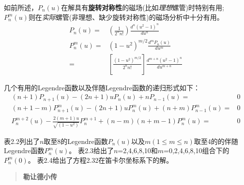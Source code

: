 如前所述，$P_n(u)$在解具有\textbf{旋转对称性}的磁场(比如\textit{理想}螺管)时特别有用;
$P_n^m(u)$则在\textit{实际}螺管(非理想、缺少旋转对称性)的磁场分析中十分有用。
\begin{subequations}\label{eqn:legendre function1}
	\begin{align}
P_n(u)=&\left(\frac{1}{2^n n!}\right)\frac{d^n(u^2-1)^n}{du^n} \\
P_n^m(u)=&(1-u^2)^{m/2}\frac{d^mP_n(u)}{du^m}\\
=&\left[\frac{(1-u^2)^{m/2}}{2^n n!}\right]\frac{d^{m+n}(u^2-1)^n}{du^{m+n}}
  	\end{align}
\end{subequations}

几个有用的Legendre函数以及伴随Legendre函数的递归形式如下：
\begin{subequations}\label{eqn:legendre function2}
	\begin{align}
(n+1)P_{n+1}(u)-(2n+1)uP_n(u)+nP_{n-1}(u)=&0  \\
(n+1-m)P^m_{n+1}(u)-(2n+1)uP^m_n(u)+(n+m)P^m_{n-1}(u)=&0  \\
P_n^{m+2}(u)-\frac{2(m+1)u}{\sqrt{(1-u^2)}}P_n^{m+1}+(n-m)(n+m-1)P_n^m(u)=&0
  	\end{align}
\end{subequations}

表2.2列出了$n$取至8的Legendre函数$P_n(u)$以及$m(1\le m\le n)$取至4的的伴随Legendre函数$P_n^m(u)$。
表2.3给出了$n$=2,4,6,8,10和$m$=0,2,4,6,8,10组合下的$P_n^m(0)$。
表2.4给出了方程2.32在笛卡尔坐标系下的解。

\begin{quotation}
\textbf{勒让德小传}\ 
\end{quotation}

